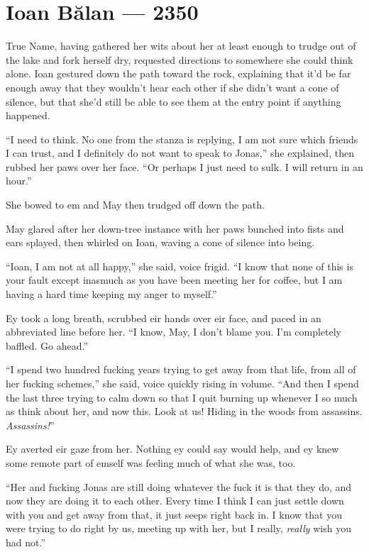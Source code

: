 \hypertarget{ioan-bux103lan-2350}{%
\chapter{Ioan Bălan — 2350}\label{ioan-bux103lan-2350}}

True Name, having gathered her wits about her at least enough to trudge out of the lake and fork herself dry, requested directions to somewhere she could think alone. Ioan gestured down the path toward the rock, explaining that it'd be far enough away that they wouldn't hear each other if she didn't want a cone of silence, but that she'd still be able to see them at the entry point if anything happened.

``I need to think. No one from the stanza is replying, I am not sure which friends I can trust, and I definitely do not want to speak to Jonas,'' she explained, then rubbed her paws over her face. ``Or perhaps I just need to sulk. I will return in an hour.''

She bowed to em and May then trudged off down the path.

May glared after her down-tree instance with her paws bunched into fists and ears splayed, then whirled on Ioan, waving a cone of silence into being.

``Ioan, I am not at all happy,'' she said, voice frigid. ``I know that none of this is your fault except inasmuch as you have been meeting her for coffee, but I am having a hard time keeping my anger to myself.''

Ey took a long breath, scrubbed eir hands over eir face, and paced in an abbreviated line before her. ``I know, May, I don't blame you. I'm completely baffled. Go ahead.''

``I spend two hundred fucking years trying to get away from that life, from all of her fucking schemes,'' she said, voice quickly rising in volume. ``And then I spend the last three trying to calm down so that I quit burning up whenever I so much as think about her, and now this. Look at us! Hiding in the woods from assassins. \emph{Assassins!}''

Ey averted eir gaze from her. Nothing ey could say would help, and ey knew some remote part of emself was feeling much of what she was, too.

``Her and fucking Jonas are still doing whatever the fuck it is that they do, and now they are doing it to each other. Every time I think I can just settle down with you and get away from that, it just seeps right back in. I know that you were trying to do right by us, meeting up with her, but I really, \emph{really} wish you had not.''

